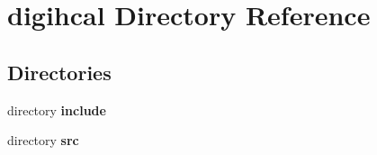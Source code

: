 \section{digihcal Directory Reference}
\label{dir_fee0bd2c627aca339098e75bfa10eab1}
\subsection*{Directories}
\begin{DoxyCompactItemize}
\item 
directory {\bf include}
\item 
directory {\bf src}
\end{DoxyCompactItemize}
